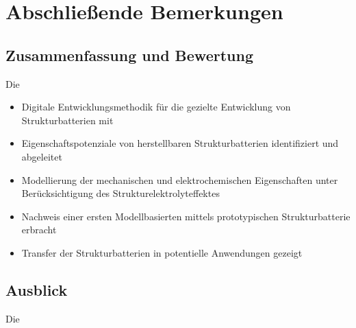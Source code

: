 \chapter{Abschließende Bemerkungen}

\section{Zusammenfassung und Bewertung}

Die 

\begin{itemize}
    \item Digitale Entwicklungsmethodik für die gezielte Entwicklung von Strukturbatterien mit 
    \item Eigenschaftspotenziale von herstellbaren Strukturbatterien identifiziert und abgeleitet
    \item Modellierung der mechanischen und elektrochemischen Eigenschaften unter Berücksichtigung des Strukturelektrolyteffektes
    \item Nachweis einer ersten Modellbasierten mittels prototypischen Strukturbatterie erbracht
    \item Transfer der Strukturbatterien in potentielle Anwendungen gezeigt
\end{itemize}

\section{Ausblick}

Die